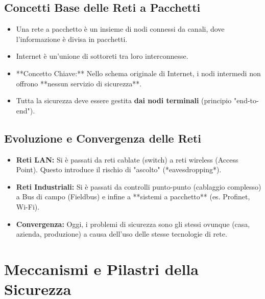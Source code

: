 \documentclass[a4paper,12pt]{article}
\begin{document}
\begin{itemize}
\subsection{Concetti Base delle Reti a Pacchetti}
\begin{itemize}
    \item Una rete a pacchetto è un insieme di nodi connessi da canali, dove l'informazione è divisa in pacchetti.
    \item Internet è un'unione di sottoreti tra loro interconnesse.
    \item **Concetto Chiave:** Nello schema originale di Internet, i nodi intermedi non offrono **nessun servizio di sicurezza**.
    \item Tutta la sicurezza deve essere gestita \textbf{dai nodi terminali} (principio "end-to-end").
\end{itemize}

\subsection{Evoluzione e Convergenza delle Reti}
\begin{itemize}
    \item \textbf{Reti LAN:} Si è passati da reti cablate (switch) a reti wireless (Access Point). Questo introduce il rischio di "ascolto" (*eavesdropping*).
    \item \textbf{Reti Industriali:} Si è passati da controlli punto-punto (cablaggio complesso) a Bus di campo (Fieldbus) e infine a **sistemi a pacchetto** (es. Profinet, Wi-Fi).
    \item \textbf{Convergenza:} Oggi, i problemi di sicurezza sono gli stessi ovunque (casa, azienda, produzione) a causa dell'uso delle stesse tecnologie di rete.
\end{itemize}

\section{Meccanismi e Pilastri della Sicurezza}


\end{itemize}
\end{document}
